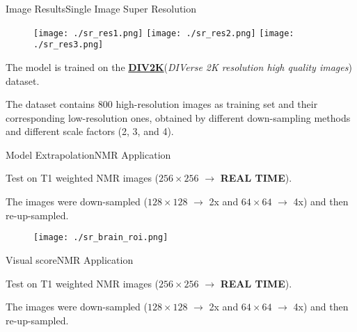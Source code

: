 \documentclass[10pt, technote, oribibl, unicode]{beamer}
\begin{document}
\begin{frame}{Image Results}{Single Image Super Resolution}

  \begin{figure}
    \begin{overprint}
      \centering\texttt{[image: ./sr\_res1.png]}
      \centering\texttt{[image: ./sr\_res2.png]}
      \centering\texttt{[image: ./sr\_res3.png]}
    \end{overprint}
  \end{figure}

  \scriptsize{The model is trained on the \href{www.vision.ee.ethz.ch/~timofter/publications/Agustsson-CVPRW-2017.pdf}{\textbf{DIV2K}}(\emph{DIVerse 2K resolution high quality images}) dataset.}

  \scriptsize{The dataset contains 800 high-resolution images as training set and their corresponding low-resolution ones, obtained by different down-sampling methods and different scale factors (2, 3, and 4).}

\end{frame}


\begin{frame}{Model Extrapolation}{NMR Application}

  \scriptsize{Test on T1 weighted NMR images ($256\times 256$ $\rightarrow$ \textbf{REAL TIME}).}

  \scriptsize{The images were down-sampled ($128\times 128$ $\rightarrow$ 2x and $64\times 64$ $\rightarrow$ 4x) and then re-up-sampled.}

  \begin{figure}

    \begin{overprint}
      \centering\texttt{[image: ./sr\_brain\_roi.png]}
      \centering\def\svgwidth{0.6\linewidth}
    \end{overprint}

  \end{figure}

\end{frame}

\begin{frame}{Visual score}{NMR Application}

  \scriptsize{Test on T1 weighted NMR images ($256\times 256$ $\rightarrow$ \textbf{REAL TIME}).}

  \scriptsize{The images were down-sampled ($128\times 128$ $\rightarrow$ 2x and $64\times 64$ $\rightarrow$ 4x) and then re-up-sampled.}

  \centering{}

\end{frame}
\end{document}
